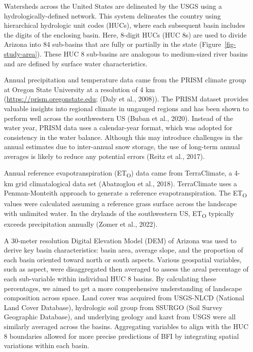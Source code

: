 \documentclass[
]{agujournal2019}
\begin{document}
Watersheds across the United States are delineated by the USGS using a
hydrologically-defined network. This system delineates the country using
hierarchical hydrologic unit codes (HUCs), where each subsequent basin
includes the digits of the enclosing basin. Here, 8-digit HUCs (HUC 8s)
are used to divide Arizona into 84 sub-basins that are fully or
partially in the state (Figure~\ref{fig-study-area}). These HUC 8
sub-basins are analogous to medium-sized river basins and are defined by
surface water characteristics.

Annual precipitation and temperature data came from the PRISM climate
group at Oregon State University at a resolution of 4 km
(\url{https://prism.oregonstate.edu;} (Daly et al., 2008)). The PRISM
dataset provides valuable insights into regional climate in ungauged
regions and has been shown to perform well across the southwestern US
(Buban et al., 2020). Instead of the water year, PRISM data uses a
calendar-year format, which was adopted for consistency in the water
balance. Although this may introduce challenges in the annual estimates
due to inter-annual snow storage, the use of long-term annual averages
is likely to reduce any potential errors (Reitz et al., 2017).

Annual reference evapotranspiration (ET\textsubscript{O}) data came from
TerraClimate, a 4-km grid climatalogical data set (Abatzoglou et al.,
2018). TerraClimate uses a Penman-Monteith approach to generate a
reference evapotranspiration. The ET\textsubscript{O} values were
calculated assuming a reference grass surface across the landscape with
unlimited water. In the drylands of the southwestern US,
ET\textsubscript{O} typically exceeds precipitation annually (Zomer et
al., 2022).

A 30-meter resolution Digital Elevation Model (DEM) of Arizona was used
to derive key basin characteristics: basin area, average slope, and the
proportion of each basin oriented toward north or south aspects. Various
geospatial variables, such as aspect, were disaggregated then averaged
to assess the areal percentage of each sub-variable within individual
HUC 8 basins. By calculating these percentages, we aimed to get a more
comprehensive understanding of landscape composition across space. Land
cover was acquired from USGS-NLCD (National Land Cover Database),
hydrologic soil group from SSURGO (Soil Survey Geographic Database), and
underlying geology and karst from USGS were all similarly averaged
across the basins. Aggregating variables to align with the HUC 8
boundaries allowed for more precise predictions of BFI by integrating
spatial variations within each basin.
\end{document}
